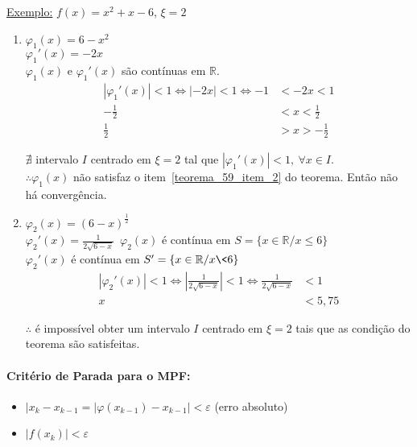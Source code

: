 \documentclass{article}
\begin{document}
        \underline{Exemplo:} $f(x) = x^2 + x - 6$, $\xi = 2$
        \begin{enumerate}
            \item $\varphi_1(x) = 6 - x^2$\\
                    $\varphi_1'(x) = -2x$\\
                    $\varphi_1(x)$ e $\varphi_1'(x)$ são contínuas em $\mathbb{R}$.
                    \begin{align*}
                        |\varphi_1'(x)| < 1 \iff |-2x| < 1 \iff -1 &< -2x < 1\\
                        - \frac{1}{2} &< x < \frac{1}{2}\\
                        \frac{1}{2} &> x > - \frac{1}{2}
                    \end{align*}

                    $\nexists$ intervalo $I$ centrado em $\xi = 2$ tal que $|\varphi_1'(x)| < 1,~\forall x \in I$.\\
                    $\therefore \varphi_1(x)$ não satisfaz o item~\ref{teorema_59_item_2} do teorema. Então não há convergência.
            \item $\varphi_2(x) = {(6-x)}^{\frac{1}{2}}$\\
                    $\varphi_2'(x) = \frac{1}{2\sqrt{6 - x}}$\
                    $\varphi_2(x)$ é contínua em $S = \{x \in \mathbb{R} / x \leq 6\}$\\
                    $\varphi_2'(x)$ é contínua em $S' = \{x \in \mathbb{R} / x \< 6\}$\\
                    \begin{align*}
                        |\varphi_2'(x)| < 1 \iff |\frac{1}{2\sqrt{6-x}}| < 1 \iff \frac{1}{2\sqrt{6-x}} &< 1\\
                        x &< 5,75
                    \end{align*}

                    $\therefore$ é impossível obter um intervalo $I$ centrado em $\xi = 2$ tais que as condição do teorema são satisfeitas.
        \end{enumerate}

        \paragraph{Critério de Parada para o MPF:}
        \begin{itemize}
            \item $|x_k - x_{k-1} = |\varphi(x_{k-1}) - x_{k-1}| < \varepsilon$ (erro absoluto)
            \item $|f(x_k)| < \varepsilon$
        \end{itemize}
\end{document}
